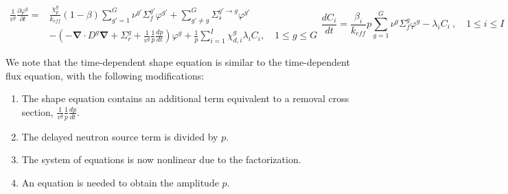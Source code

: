 \documentclass[12pt]{scrartcl}
\renewcommand{\div}{\bs{\nabla}\! \cdot \!}
\newcommand{\grad}{\bs{\nabla}}
\newcommand{\bs}[1]{\mathbf{#1}}
\newcommand{\keff}{k_\textit{eff}}
\newcommand{\be}{\begin{equation}}
\newcommand{\ee}{\end{equation}}
\begin{document}
\begin{subequations}
\begin{align}
\frac{1}{v^g}\frac{\partial \varphi^g}{\partial t} = &\frac{\chi_p^g}{\keff} (1-\beta)\sum_{g'=1}^G  \nu^{g'} \Sigma_f^{g'} \varphi^{g'} + \sum_{g'\neq g}^G\Sigma_s^{g'\to g} \varphi^{g'} \nonumber \\ 
& -  \left( -\div D^g \grad  + \Sigma_r^g + \boxed{\frac{1}{v^g}\frac{1}{p}\frac{dp}{dt}}\right) \varphi^g + \boxed{\frac{1}{p}}\sum_{i=1}^I\chi_{d,i}^g\lambda_iC_i  , \quad 1 \le g \le G 
\label{eq:shape}
\end{align}
\be
\frac{dC_i}{dt} = \frac{\beta_i}{\keff}\boxed{p} \sum_{g=1}^G\nu^{g} \Sigma_f^g \varphi^{g} - \lambda_i C_i \ , \quad 1 \le i \le I 
\label{eq:prec}
\ee
\end{subequations}

We note that the time-dependent shape equation is similar to the time-dependent flux equation, with the following modifications:
\begin{enumerate}
\item The shape equation contains an additional term equivalent to a removal cross section,  $ \frac{1}{v^g}\frac{1}{p}\frac{dp}{dt}$.
\item The delayed neutron source term is divided by $p$.
\item The system of equations is now nonlinear due to the factorization.
\item An equation is needed to obtain the amplitude $p$.
\end{enumerate}
\end{document}
